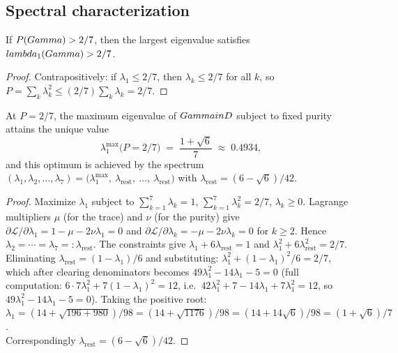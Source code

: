 \subsection{Spectral characterization}
\label{app:pcrit-spectral}

\begin{lemma}\label{lem:spectral-oneside}
If $P(Gamma) > 2/7$, then the largest eigenvalue satisfies $lambda_1(Gamma) > 2/7$.
\end{lemma}

\begin{proof}
Contrapositively: if $\lambda_1 \leq 2/7$, then $\lambda_k \leq 2/7$ for all $k$, so
$P = \sum_k \lambda_k^2 \leq (2/7)\sum_k \lambda_k = 2/7$.
\end{proof}

\begin{theorembox}
At $P = 2/7$, the maximum eigenvalue of $Gamma in D$ subject to fixed
purity attains the unique value
\[
  \lambda_1^{\max}\bigl(P = 2/7\bigr) \;=\; \frac{1 + \sqrt{6}}{7} \;\approx\; 0.4934,
\]
and this optimum is achieved by the spectrum
$(\lambda_1, \lambda_2, \ldots, \lambda_7) = \bigl(\lambda_1^{\max},\ \lambda_{\mathrm{rest}},\ \ldots,\ \lambda_{\mathrm{rest}}\bigr)$
with $\lambda_{\mathrm{rest}} = (6 - \sqrt{6})/42$.
\end{theorembox}

\begin{proof}
Maximize $\lambda_1$ subject to $\sum_{k=1}^{7}\lambda_k = 1$,
$\sum_{k=1}^{7}\lambda_k^2 = 2/7$, $\lambda_k \geq 0$. Lagrange multipliers
$\mu$ (for the trace) and $\nu$ (for the purity) give
$\partial\mathcal{L}/\partial\lambda_1 = 1 - \mu - 2\nu\lambda_1 = 0$ and
$\partial\mathcal{L}/\partial\lambda_k = -\mu - 2\nu\lambda_k = 0$ for $k \geq 2$.
Hence $\lambda_2 = \cdots = \lambda_7 =: \lambda_{\mathrm{rest}}$.
The constraints give
$\lambda_1 + 6\lambda_{\mathrm{rest}} = 1$ and
$\lambda_1^2 + 6\lambda_{\mathrm{rest}}^2 = 2/7$.
Eliminating $\lambda_{\mathrm{rest}} = (1-\lambda_1)/6$ and substituting:
$\lambda_1^2 + (1-\lambda_1)^2/6 = 2/7$,
which after clearing denominators becomes
$49\lambda_1^2 - 14\lambda_1 - 5 = 0$
(full computation: $6\cdot 7\lambda_1^2 + 7(1-\lambda_1)^2 = 12$, i.e.\ $42\lambda_1^2 + 7 - 14\lambda_1 + 7\lambda_1^2 = 12$, so $49\lambda_1^2 - 14\lambda_1 - 5 = 0$).
Taking the positive root:
$\lambda_1 = (14 + \sqrt{196 + 980})/98 = (14 + \sqrt{1176})/98 = (14 + 14\sqrt{6})/98 = (1+\sqrt 6)/7$. \\
Correspondingly $\lambda_{\mathrm{rest}} = (6 - \sqrt 6)/42$.
\end{proof}

